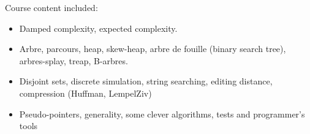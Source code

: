 Course content included:
\begin{itemize}
    \item Damped complexity, expected complexity.
    \item Arbre, parcours, heap, skew-heap, arbre de fouille (binary search tree), arbres-splay, treap, B-arbres.
    \item Disjoint sets, discrete simulation, string searching, editing distance, compression (Huffman, LempelZiv)
    \item Pseudo-pointers, generality, some clever algorithms, tests and programmer's tools
\end{itemize}